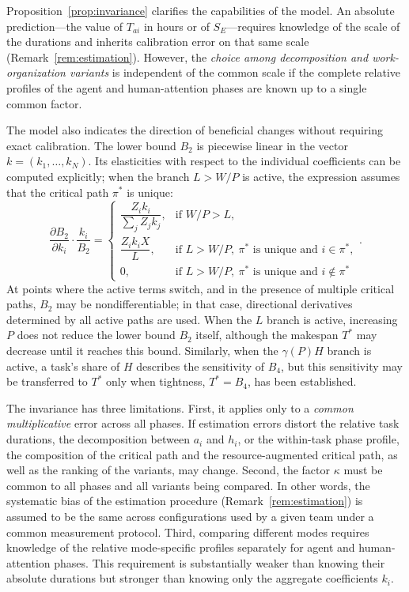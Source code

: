 \begin{remark}\label{rem:comparative}
Proposition~\ref{prop:invariance} clarifies the capabilities of the model. An absolute prediction---the value of $T_{ai}$ in hours or of $S_E$---requires knowledge of the scale of the durations and inherits calibration error on that same scale (Remark~\ref{rem:estimation}). However, the \emph{choice among decomposition and work-organization variants} is independent of the common scale if the complete relative profiles of the agent and human-attention phases are known up to a single common factor.

The model also indicates the direction of beneficial changes without requiring exact calibration. The lower bound $B_2$ is piecewise linear in the vector $k = (k_1, \dots, k_N)$. Its elasticities with respect to the individual coefficients can be computed explicitly; when the branch $L>W/P$ is active, the expression assumes that the critical path $\pi^*$ is unique:
\[
  \frac{\partial B_2}{\partial k_i} \cdot \frac{k_i}{B_2} =
  \begin{cases}
    \dfrac{Z_i k_i}{\sum_{j} Z_j k_j}, & \text{if } W/P > L, \\[2.5ex]
    \dfrac{Z_i k_i X}{L}, & \text{if } L > W/P,\ \pi^*\text{ is unique and }i \in \pi^{*}, \\[2.5ex]
    0, & \text{if } L > W/P,\ \pi^*\text{ is unique and }i \notin \pi^{*}
  \end{cases}.
\]
At points where the active terms switch, and in the presence of multiple critical paths, $B_2$ may be nondifferentiable; in that case, directional derivatives determined by all active paths are used. When the $L$ branch is active, increasing $P$ does not reduce the lower bound $B_2$ itself, although the makespan $T^*$ may decrease until it reaches this bound. Similarly, when the $\gamma(P)H$ branch is active, a task's share of $H$ describes the sensitivity of $B_4$, but this sensitivity may be transferred to $T^*$ only when tightness, $T^*=B_4$, has been established.

The invariance has three limitations. First, it applies only to a
\emph{common multiplicative} error across all phases. If estimation errors distort
the relative task durations, the decomposition between $a_i$ and $h_i$, or the
within-task phase profile, the composition of the critical path and the
resource-augmented critical path, as well as the ranking of the variants, may
change. Second, the factor $\kappa$ must be common to all phases and all variants
being compared. In other words, the systematic bias of the estimation procedure
(Remark~\ref{rem:estimation}) is assumed to be the same across configurations
used by a given team under a common measurement protocol. Third, comparing
different modes requires knowledge of the relative mode-specific profiles
separately for agent and human-attention phases. This requirement is substantially
weaker than knowing their absolute durations but stronger than knowing only the
aggregate coefficients $k_i$.
\end{remark}

